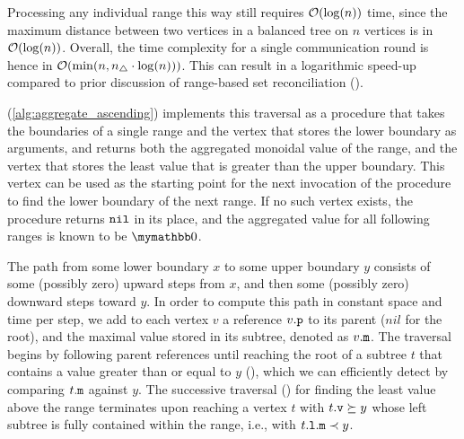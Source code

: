 \documentclass[conference]{IEEEtran}
\begin{document}
Processing any individual range this way still requires $\mathcal{O}(\log(n))$ time, since the maximum distance between two vertices in a balanced tree on $n$ vertices is in $\mathcal{O}(\log(n))$. Overall, the time complexity for a single communication round is hence in $\mathcal{O}(\min(n, n_{\triangle} \cdot \log(n)))$. This can result in a logarithmic speed-up compared to prior discussion of range-based set reconciliation (\cite{chen1999prototype}\cite{shang2017survey}).


 (\cref{alg:aggregate_ascending}) implements this traversal as a procedure that takes the boundaries of a single range and the vertex that stores the lower boundary as arguments, and returns both the aggregated monoidal value of the range, and the vertex that stores the least value that is greater than the upper boundary. This vertex can be used as the starting point for the next invocation of the procedure to find the lower boundary of the next range. If no such vertex exists, the procedure returns $\mathtt{nil}$ in its place, and the aggregated value for all following ranges is known to be $\neutraladd$.

The path from some lower boundary $x$ to some upper boundary $y$ consists of some (possibly zero) upward steps from $x$, and then some (possibly zero) downward steps toward $y$. In order to compute this path in constant space and time per step, we add to each vertex $v$ a reference ${v}\mathtt{.p}$ to its parent ($nil$ for the root), and the maximal value stored in its subtree, denoted as ${v}\mathtt{.m}$. The traversal begins by following parent references until reaching the root of a subtree $t$ that contains a value greater than or equal to $y$ (), which we can efficiently detect by comparing ${t}\mathtt{.m}$ against $y$. The successive traversal () for finding the least value above the range terminates upon reaching a vertex $t$ with ${t}\mathtt{.v} \succeq y$ whose left subtree is fully contained within the range, i.e., with ${{t}\mathtt{.l}}\mathtt{.m} \prec y$.
\end{document}
